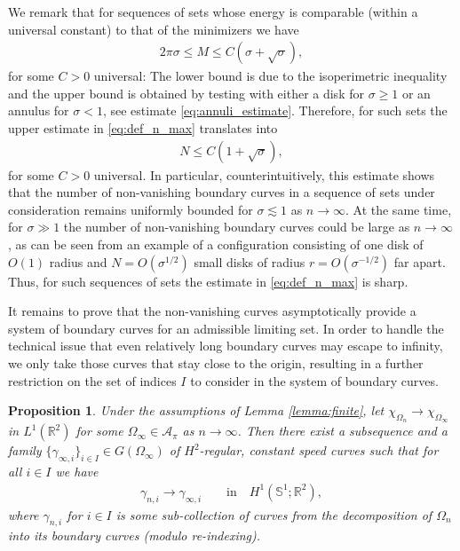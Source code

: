 \documentclass[11pt]{article}
\newcounter{statement}
\numberwithin{statement}{section}
\numberwithin{equation}{section}
\newtheorem{prop}[statement]{Proposition}
\theoremstyle{remark}
\newcommand{\R}{\mathbb R} 				%
\newcommand{\Sph}{{\mathbb S}}				%
\begin{document}
    We remark that for sequences of sets whose energy is
      comparable (within a universal constant) to that of the
      minimizers we have
      \begin{align}
        2 \pi \sigma \leq M \leq C (\sigma  + \sqrt{\sigma}),
      \end{align}
      for some $C > 0$ universal: The lower bound is due to the
      isoperimetric inequality and the upper bound is obtained by
      testing with either a disk for $\sigma \geq 1$ or an annulus for
      $\sigma < 1$, see estimate \eqref{eq:annuli_estimate}.
      Therefore, for such sets the upper estimate in
      \eqref{eq:def_n_max} translates into
      \begin{align}
        \label{eq:NCMsig}
        N \leq C \left(1 + \sqrt{\sigma} \right), 
      \end{align}
      for some $C > 0$ universal. In particular,
      counterintuitively, this estimate shows that the number of
      non-vanishing boundary curves in a sequence of sets under
      consideration remains uniformly bounded for $\sigma \lesssim 1$
      as $n \to \infty$. At the same time, for $\sigma \gg 1$ the
      number of non-vanishing boundary curves could be large as
      $n \to \infty$, as can be seen from an example of a
      configuration consisting of one disk of $O(1)$ radius and
      $N = O(\sigma^{1/2})$ small disks of radius
      $r = O(\sigma^{-1/2})$ far apart. Thus, for such sequences of
      sets the estimate in \eqref{eq:def_n_max} is sharp.

      It remains to prove that the non-vanishing curves asymptotically
      provide a system of boundary curves for an admissible limiting
      set.  In order to handle the technical issue that even
      relatively long boundary curves may escape to infinity, we
      only take those curves that stay close to the origin, resulting
      in a further restriction on the set of indices $I$ to consider
      in the system of boundary curves.

\begin{prop}\label{prop:compactness}
  Under the assumptions of Lemma \ref{lemma:finite}, let
    $\chi_{\Omega_n} \to \chi_{\Omega_\infty}$ in $L^1(\R^2)$ for
    some $\Omega_\infty \in \mathcal{A}_\pi$ as
      $n \to \infty$. Then there exist a subsequence and a family
  $\{\gamma_{\infty,i}\}_{i\in I} \in G(\Omega_\infty)$ of
  $H^2$-regular, constant speed curves such that for all $i\in I$ we
  have
	\begin{align}
          \gamma_{n,i} \to
          \gamma_{\infty,i} \qquad \text{in} \quad H^1(\Sph^1; \R^2),
	\end{align}
	 where $\gamma_{n,i}$ for $i \in I$ is
        some sub-collection of curves from the decomposition of
        $\Omega_{n}$ into its boundary curves (modulo
          re-indexing).
\end{prop}	
	
\end{document}
